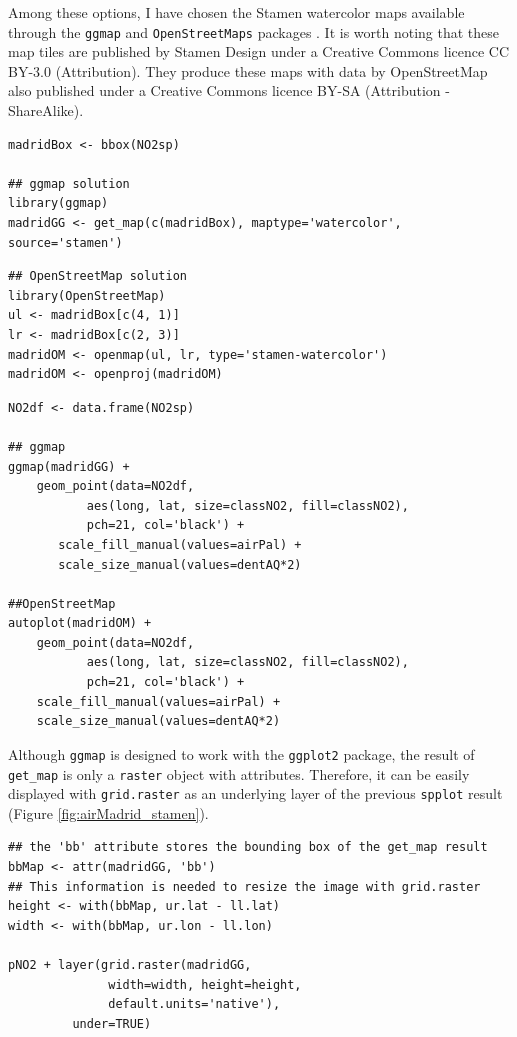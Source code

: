 \documentclass[smallroyalvopaper]{memoir}
\begin{document}
Among these options, I have chosen the Stamen watercolor maps
available through the \texttt{ggmap} \cite{Kahle.Wickham2013} and
\texttt{OpenStreetMaps} packages \cite{Fellows.Stotz2013}. It is worth noting
that these map tiles are published by Stamen Design under a Creative
Commons licence CC BY-3.0 (Attribution). They produce these maps with
data by OpenStreetMap also published under a Creative Commons licence
BY-SA (Attribution - ShareAlike).


\lstset{language=R,numbers=none}
\begin{lstlisting}
madridBox <- bbox(NO2sp)

## ggmap solution
library(ggmap)
madridGG <- get_map(c(madridBox), maptype='watercolor', source='stamen')
\end{lstlisting}

\lstset{language=R,numbers=none}
\begin{lstlisting}
## OpenStreetMap solution
library(OpenStreetMap)
ul <- madridBox[c(4, 1)]
lr <- madridBox[c(2, 3)]
madridOM <- openmap(ul, lr, type='stamen-watercolor')
madridOM <- openproj(madridOM)
\end{lstlisting}

\lstset{language=R,numbers=none}
\begin{lstlisting}
NO2df <- data.frame(NO2sp)

## ggmap
ggmap(madridGG) +
    geom_point(data=NO2df,
	       aes(long, lat, size=classNO2, fill=classNO2),
	       pch=21, col='black') +
       scale_fill_manual(values=airPal) +
       scale_size_manual(values=dentAQ*2)

##OpenStreetMap
autoplot(madridOM) + 
    geom_point(data=NO2df,
	       aes(long, lat, size=classNO2, fill=classNO2),
	       pch=21, col='black') +
    scale_fill_manual(values=airPal) +
    scale_size_manual(values=dentAQ*2)
\end{lstlisting}

Although \texttt{ggmap} is designed to work with the \texttt{ggplot2} package, the
result of \texttt{get\_map} is only a \texttt{raster} object with
attributes. Therefore, it can be easily displayed with \texttt{grid.raster}
as an underlying layer of the previous \texttt{spplot} result (Figure
\ref{fig:airMadrid_stamen}).

\lstset{language=R,numbers=none}
\begin{lstlisting}
## the 'bb' attribute stores the bounding box of the get_map result
bbMap <- attr(madridGG, 'bb')
## This information is needed to resize the image with grid.raster
height <- with(bbMap, ur.lat - ll.lat)
width <- with(bbMap, ur.lon - ll.lon)

pNO2 + layer(grid.raster(madridGG,
			  width=width, height=height,
			  default.units='native'),
	     under=TRUE)
\end{lstlisting}
\end{document}
